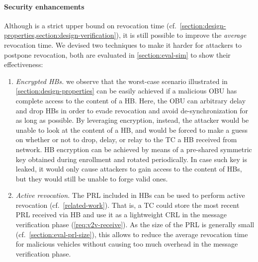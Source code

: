 \paragraph{Security enhancements}
%
Although \paramteff{} is a strict upper bound on revocation time
(cf.~\cref{section:design-properties,section:design-verification}), it is still
possible to improve the \emph{average} revocation time. We devised two
techniques to make it harder for attackers to postpone revocation, both are evaluated in \cref{section:eval-sim} to show their effectiveness:
%
\begin{enumerate}
    \item \emph{Encrypted \acp{HB}.} we observe that the worst-case scenario
    illustrated in \cref{section:design-properties} can be easily achieved if a
    malicious \ac{OBU} has complete access to the content of a \ac{HB}. Here,
    the \ac{OBU} can arbitrary delay and drop \acp{HB} in order to evade
    revocation and avoid de-synchronization for as long as possible. By
    leveraging encryption, instead, the attacker would be unable to look at the
    content of a \ac{HB}, and would be forced to make a guess on whether or not
    to drop, delay, or relay to the \ac{TC} a \ac{HB} received from network.
    \ac{HB} encryption can be achieved by means of a pre-shared symmetric key
    obtained during enrollment and rotated periodically. In case such key is
    leaked, it would only cause attackers to gain access to the content of
    \acp{HB}, but they would still be unable to forge valid ones.
    \item \emph{Active revocation.} The \ac{PRL} included in \acp{HB} can be
    used to perform active revocation (cf.~\cref{related-work}). That is, a
    \ac{TC} could store the most recent \ac{PRL} received via \ac{HB} and use it
    as a lightweight \ac{CRL} in the message verification phase
    (\cref{req:v2v-receive}). As the size of the \ac{PRL} is generally small
    (cf.~\cref{section:eval-prl-size}), this allows to reduce the average
    revocation time for malicious vehicles without causing too much overhead in
    the message verification phase.
\end{enumerate}
%
